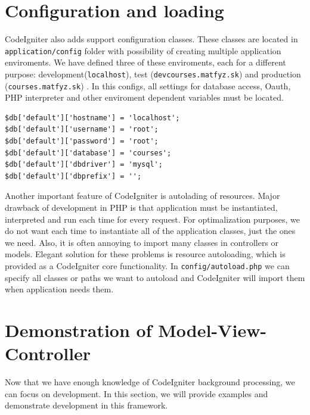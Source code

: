 \section{Configuration and loading}


CodeIgniter also adds support configuration classes. These classes are located in \texttt{application/config} folder with possibility of creating multiple application enviroments. We have defined three of these enviroments, each for a different purpose: development(\texttt{localhost}), test (\texttt{devcourses.matfyz.sk}) and production (\texttt{courses.matfyz.sk}) . In this configs, all settings for database access, Oauth, PHP interpreter and other enviroment dependent variables must be located. 

\begin{lstlisting}[basicstyle=\small,caption={Database configuration for development enviroment}]
$db['default']['hostname'] = 'localhost';
$db['default']['username'] = 'root';
$db['default']['password'] = 'root';
$db['default']['database'] = 'courses';
$db['default']['dbdriver'] = 'mysql';
$db['default']['dbprefix'] = '';
\end{lstlisting}



Another important feature of CodeIgniter is autolading of resources. Major drawback of development in PHP is that application must be instantiated, interpreted and run each time for every request. For optimalization purposes, we do not want each time to instantiate all of the application classes, just the ones we need. Also, it is often annoying to import many classes in controllers or models. Elegant solution for these problems is resource autoloading, which is provided as a CodeIgniter core functionality. In \texttt{config/autoload.php} we can specify all classes or paths we want to autoload and CodeIgniter will import them when application needs them.


\section{Demonstration of Model-View-Controller}
Now that we have enough knowledge of CodeIgniter background processing, we can focus on development. In this section, we will provide examples and demonstrate development in this framework.

